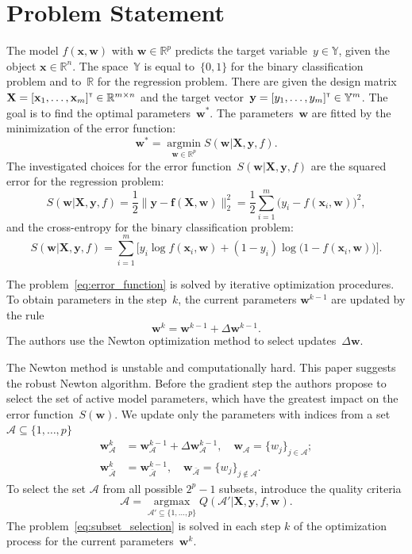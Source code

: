 \documentclass[a4paper,12pt]{article}
\theoremstyle{plain} %
\theoremstyle{definition} %
\theoremstyle{remark} %
\newcommand{\bw}{\mathbf{w}}
\newcommand{\by}{\mathbf{y}}
\newcommand{\bx}{\mathbf{x}}
\newcommand{\cA}{\mathcal{A}}
\newcommand{\bbR}{\mathbb{R}}
\newcommand{\bbY}{\mathbb{Y}}
\newcommand{\bX}{\mathbf{X}}
\newcommand{\T}{{\text{\tiny\sffamily\upshape\mdseries T}}}
\newcommand{\argmin}{\mathop{\arg \min}\limits}
\newcommand{\argmax}{\mathop{\arg \max}\limits}
\begin{document}
	\section*{Problem Statement}
	The model $f( \bx, \bw)$ with $\bw \in \mathbb{R}^p$ predicts the target variable~$y \in \bbY$, given the object $\bx \in \bbR^{n}$. The space~$\bbY$ is equal to~$\{0, 1\}$ for the binary classification problem and to~$\bbR$ for the regression problem.
	There are given the design matrix~$\bX = [\bx_1, \dots, \bx_m]^{\T} \in \bbR^{m \times n}$ and the target vector~$\by = [y_1, \dots, y_m]^{\T} \in \bbY^{m}$. 
	The goal is to find the optimal parameters~$\bw^*$.
	The parameters~$\bw$ are fitted by the minimization of the error function:
	\begin{equation}
	\bw^* = \argmin_{\bw \in \bbR^p} S(\bw | \bX, \by, f).
	\label{eq:error_function}
	\end{equation}
	The investigated choices for the error function~$S(\bw | \bX, \by, f)$ are
	the squared error for the regression problem: 
	\begin{equation}
	S(\bw | \bX, \by, f) = \frac 12 \| \by - \mathbf{f}(\bX, \bw) \|_2^2 = \frac 12 \sum_{i=1}^m \bigl( y_i - f(\bx_i,  \bw)\bigr)^2,
	\label{eq:squared_error}
	\end{equation}
	and the cross-entropy for the binary classification problem: 
	\begin{equation}
	S(\bw | \bX, \by, f) = \sum_{i=1}^m \bigl[y_i \log f (\bx_i , \bw) + (1-y_i) \log \bigl(1 - f (\bx_i , \bw)\bigr)\bigr].
	\label{eq:log_loss}
	\end{equation}
	
	The problem~\eqref{eq:error_function} is solved by iterative optimization procedures. 
	To obtain parameters in the step~$k$, the current parameters $\bw^{k-1}$ are updated by the rule
	\begin{equation}
	\bw^k = \bw^{k - 1} + \Delta \bw^{k - 1}.
	\label{eq:update_rule}
	\end{equation}
	The authors use the Newton optimization method to select  updates~$\Delta \bw$.
	
	The Newton method is unstable and computationally hard. 
	This paper suggests the robust Newton algorithm. 
	Before the gradient step the authors propose to select the set of active model parameters, which have the greatest impact on the error function~$S(\bw)$.
	We update only the parameters with indices from a set $\cA \subseteq \{ 1, \dots, p \}$
	\begin{align*}
	\bw_{\cA}^k &= \bw_{\cA}^{k - 1} + \Delta \bw_{\cA}^{k - 1}, \quad \bw_{\cA} = \{w_j\}_{j \in \cA}; \\
	\bw_{\bar{\cA}}^k &= \bw_{\bar{\cA}}^{k - 1}, \quad \bw_{\bar{\cA}} = \{w_j\}_{j \notin \cA}.
	\end{align*}
	To select the set $\cA$ from all possible $2^p - 1$ subsets, introduce the quality criteria 
	\begin{equation}
	\cA = \argmax_{\cA' \subseteq \{1, \dots, p\}} Q(\cA' | \bX, \by, f, \bw).
	\label{eq:subset_selection}
	\end{equation}
	The problem~\eqref{eq:subset_selection} is solved in each step $k$ of the optimization process for the current parameters~$\bw^k$.
	
\end{document}
